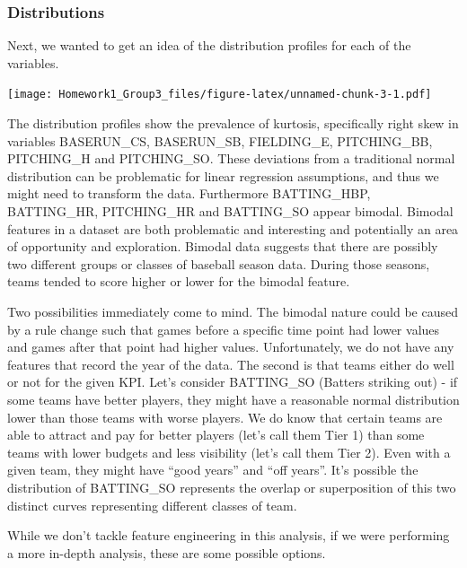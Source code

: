 \documentclass[
]{article}
\begin{document}
\hypertarget{distributions}{%
\subsubsection{Distributions}\label{distributions}}

Next, we wanted to get an idea of the distribution profiles for each of
the variables.

\texttt{[image: Homework1\_Group3\_files/figure-latex/unnamed-chunk-3-1.pdf]}

The distribution profiles show the prevalence of kurtosis, specifically
right skew in variables BASERUN\_CS, BASERUN\_SB, FIELDING\_E,
PITCHING\_BB, PITCHING\_H and PITCHING\_SO. These deviations from a
traditional normal distribution can be problematic for linear regression
assumptions, and thus we might need to transform the data. Furthermore
BATTING\_HBP, BATTING\_HR, PITCHING\_HR and BATTING\_SO appear bimodal.
Bimodal features in a dataset are both problematic and interesting and
potentially an area of opportunity and exploration. Bimodal data
suggests that there are possibly two different groups or classes of
baseball season data. During those seasons, teams tended to score higher
or lower for the bimodal feature.

Two possibilities immediately come to mind. The bimodal nature could be
caused by a rule change such that games before a specific time point had
lower values and games after that point had higher values.
Unfortunately, we do not have any features that record the year of the
data. The second is that teams either do well or not for the given KPI.
Let's consider BATTING\_SO (Batters striking out) - if some teams have
better players, they might have a reasonable normal distribution lower
than those teams with worse players. We do know that certain teams are
able to attract and pay for better players (let's call them Tier 1) than
some teams with lower budgets and less visibility (let's call them Tier
2). Even with a given team, they might have ``good years'' and ``off
years''. It's possible the distribution of BATTING\_SO represents the
overlap or superposition of this two distinct curves representing
different classes of team.

While we don't tackle feature engineering in this analysis, if we were
performing a more in-depth analysis, these are some possible options.
\end{document}
